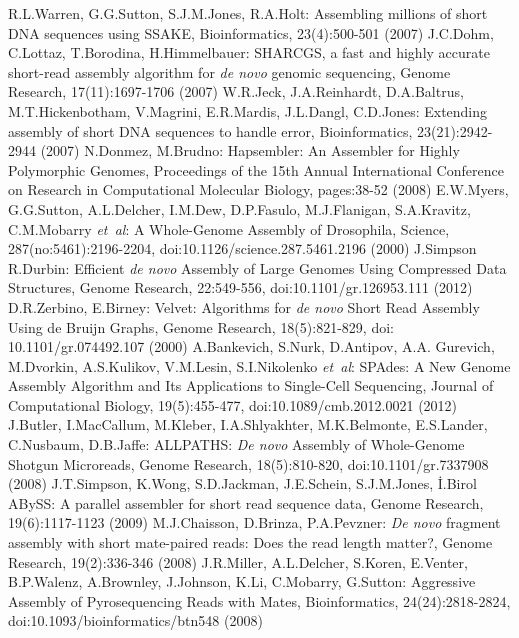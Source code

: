 \documentclass{llncs}
\begin{document}
%
%
\begin{thebibliography}{}
%

 R.L.Warren, G.G.Sutton, S.J.M.Jones, R.A.Holt: Assembling millions of short DNA sequences using SSAKE, Bioinformatics, 23(4):500-501 (2007)
 J.C.Dohm, C.Lottaz, T.Borodina, H.Himmelbauer: SHARCGS, a fast and highly accurate short-read assembly algorithm for \textit{de novo} genomic sequencing, Genome Research, 17(11):1697-1706 (2007)
 W.R.Jeck, J.A.Reinhardt, D.A.Baltrus, M.T.Hickenbotham, V.Magrini, E.R.Mardis, J.L.Dangl, C.D.Jones: Extending assembly of short DNA sequences to handle error, Bioinformatics, 23(21):2942-2944 (2007)
 N.Donmez, M.Brudno: Hapsembler: An Assembler for Highly Polymorphic Genomes, Proceedings of the 15th Annual International Conference on Research in Computational Molecular Biology, pages:38-52 (2008)
 E.W.Myers, G.G.Sutton, A.L.Delcher, I.M.Dew, D.P.Fasulo, M.J.Flanigan, S.A.Kravitz, C.M.Mobarry \textit{et~al}: A Whole-Genome Assembly of Drosophila, Science, {287(no:5461)}:2196-2204, doi:10.1126/science.287.5461.2196 (2000)
 J.Simpson R.Durbin: Efficient \textit{de novo} Assembly of Large Genomes Using Compressed Data Structures, Genome Research, {22}:549-556, doi:10.1101/gr.126953.111 (2012)
 D.R.Zerbino, E.Birney: Velvet: Algorithms for \textit{de novo} Short Read Assembly Using de Bruijn Graphs, Genome Research, {18(5)}:821-829, doi: 10.1101/gr.074492.107 (2000)
 A.Bankevich, S.Nurk, D.Antipov, A.A. Gurevich, M.Dvorkin, A.S.Kulikov, V.M.Lesin, S.I.Nikolenko {\it et~al}: SPAdes: A New Genome Assembly Algorithm and Its Applications to Single-Cell Sequencing, Journal of Computational Biology, {19(5)}:455-477, doi:10.1089/cmb.2012.0021 (2012)
 J.Butler, I.MacCallum, M.Kleber, I.A.Shlyakhter, M.K.Belmonte, E.S.Lander, C.Nusbaum, D.B.Jaffe: ALLPATHS: \textit{De novo} Assembly of Whole-Genome Shotgun Microreads, Genome Research, {18(5)}:810-820, doi:10.1101/gr.7337908 (2008)
 J.T.Simpson, K.Wong, S.D.Jackman, J.E.Schein, S.J.M.Jones, İ.Birol ABySS: A parallel assembler for short read sequence data, Genome Research, 19(6):1117-1123 (2009)
 M.J.Chaisson, D.Brinza, P.A.Pevzner: \textit{De novo} fragment assembly with short mate-paired reads: Does the read length matter?, Genome Research, 19(2):336-346 (2008)
 J.R.Miller, A.L.Delcher, S.Koren, E.Venter, B.P.Walenz, A.Brownley, J.Johnson, K.Li, C.Mobarry, G.Sutton: Aggressive Assembly of Pyrosequencing Reads with Mates, Bioinformatics, {24(24)}:2818-2824, doi:10.1093/bioinformatics/btn548 (2008)

\end{thebibliography}
\end{document}
